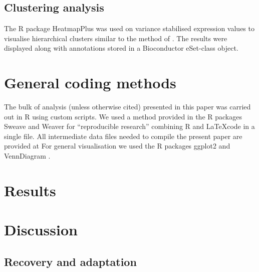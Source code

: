 \subsection{Clustering analysis}

The R package HeatmapPlus was used on variance stabilised expression
values to visualise hierarchical clusters similar to the method of
\cite{pmid9843981}. The results were displayed along with annotations
stored in a Bioconductor eSet-class object.

\section{General coding methods}

The bulk of analysis (unless otherwise cited) presented in this paper
was carried out in R \cite{R_project} using custom scripts. We used a
method provided in the R packages Sweave
\cite{lmucs-papers:Leisch:2002} and Weaver \cite{weaver} for
``reproducible research'' combining R and \LaTeX code in a single
file. All intermediate data files needed to compile the present paper
are provided at For general visualisation we used the R packages
ggplot2 \cite{ggplot-book} and VennDiagram \cite{pmid21269502}.


\section{Results}


\section{Discussion}



\subsection{Recovery and adaptation}
\label{sec:recovery}


